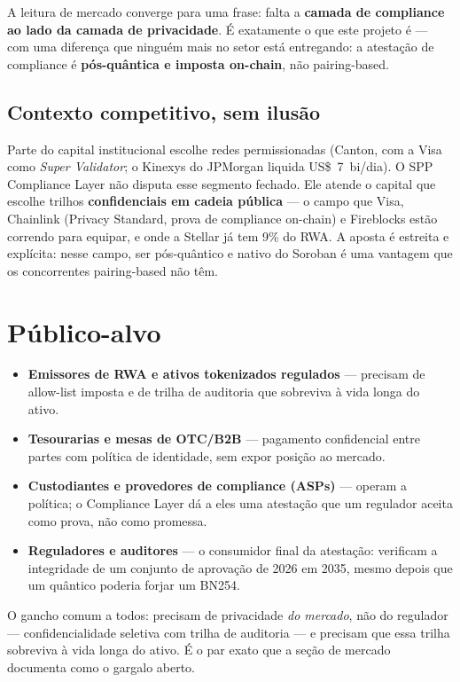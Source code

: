 \documentclass[11pt]{article}
\newcommand{\keybox}[1]{%
  \par\vspace{0.6em}%
  \noindent\colorbox{soft}{\parbox{\dimexpr\linewidth-2\fboxsep}{%
  \vspace{0.3em}\small #1\vspace{0.3em}}}%
  \par\vspace{0.6em}%
}
\begin{document}
\keybox{A leitura de mercado converge para uma frase: falta a \textbf{camada de
compliance ao lado da camada de privacidade}. É exatamente o que este projeto é
--- com uma diferença que ninguém mais no setor está entregando: a atestação de
compliance é \textbf{pós-quântica e imposta on-chain}, não pairing-based.}

\subsection*{Contexto competitivo, sem ilusão}

Parte do capital institucional escolhe redes permissionadas (Canton, com a Visa
como \emph{Super Validator}; o Kinexys do JPMorgan liquida US\$~7~bi/dia). O SPP
Compliance Layer não disputa esse segmento fechado. Ele atende o capital que
escolhe trilhos \textbf{confidenciais em cadeia pública} --- o campo que Visa,
Chainlink (Privacy Standard, prova de compliance on-chain) e Fireblocks estão
correndo para equipar, e onde a Stellar já tem 9\% do RWA. A aposta é estreita e
explícita: nesse campo, ser pós-quântico e nativo do Soroban é uma vantagem que os
concorrentes pairing-based não têm.

\section{Público-alvo}

\begin{itemize}
\item \textbf{Emissores de RWA e ativos tokenizados regulados} --- precisam de
allow-list imposta e de trilha de auditoria que sobreviva à vida longa do ativo.
\item \textbf{Tesourarias e mesas de OTC/B2B} --- pagamento confidencial entre
partes com política de identidade, sem expor posição ao mercado.
\item \textbf{Custodiantes e provedores de compliance (ASPs)} --- operam a
política; o Compliance Layer dá a eles uma atestação que um regulador aceita como
prova, não como promessa.
\item \textbf{Reguladores e auditores} --- o consumidor final da atestação:
verificam a integridade de um conjunto de aprovação de 2026 em 2035, mesmo depois
que um quântico poderia forjar um BN254.
\end{itemize}

O gancho comum a todos: precisam de privacidade \emph{do mercado}, não do
regulador --- confidencialidade seletiva com trilha de auditoria --- e precisam
que essa trilha sobreviva à vida longa do ativo. É o par exato que a seção de
mercado documenta como o gargalo aberto.
\end{document}
